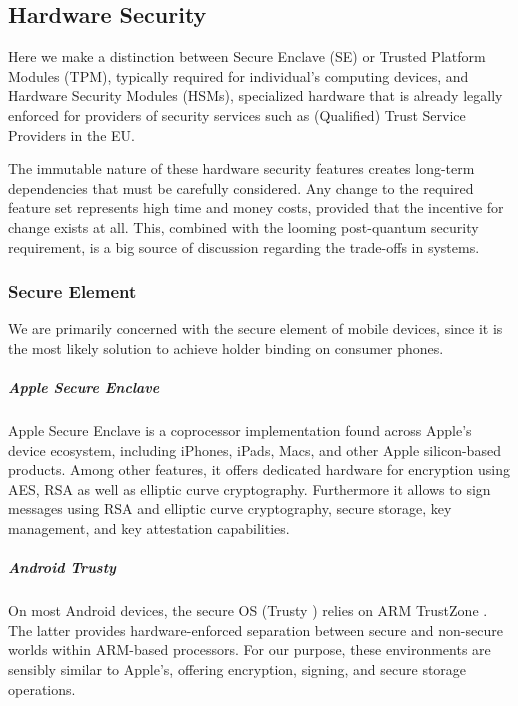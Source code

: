 
\subsection{Hardware Security}

Here we make a distinction between Secure Enclave (SE) or Trusted Platform Modules (TPM), typically required for individual's computing devices, and Hardware Security Modules (HSMs), specialized hardware that is already legally enforced for providers of security services such as (Qualified) Trust Service Providers in the EU.

The immutable nature of these hardware security features creates long-term dependencies that must be carefully considered. Any change to the required feature set represents high time and money costs, provided that the incentive for change exists at all. This, combined with the looming post-quantum security requirement, is a big source of discussion regarding the trade-offs in \eid systems.


\subsubsection{Secure Element} We are primarily concerned with the secure element of mobile devices, since it is the most likely solution to achieve holder binding on consumer phones.

\subparagraph{Apple Secure Enclave}

Apple Secure Enclave \cite{apple-secure-enclaves} is a coprocessor implementation found across Apple's device ecosystem, including iPhones, iPads, Macs, and other Apple silicon-based products. Among other features, it offers dedicated hardware for encryption using AES, RSA as well as elliptic curve cryptography.
Furthermore it allows to sign messages using RSA and elliptic curve cryptography, secure storage, key management, and key attestation capabilities.

\subparagraph{Android Trusty}

On most Android devices, the secure OS (Trusty \cite{trusty}) relies on ARM TrustZone \cite{arm-trustzone}. The latter provides hardware-enforced separation between secure and non-secure worlds within ARM-based processors.
For our purpose, these environments are sensibly similar to Apple's, offering encryption, signing, and secure storage operations.



